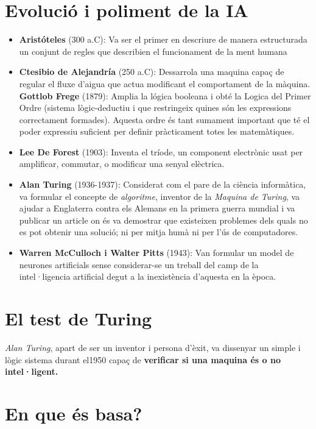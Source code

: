 \section{Evolució i poliment de la IA}
\begin{itemize}
\item  \textbf{Aristóteles} (300 a.C): Va ser el primer en descriure de manera estructurada un conjunt de regles que describien el funcionament de la ment humana
\item  \textbf{Ctesibio de Alejandría} (250 a.C): Dessarrola una maquina capaç de regular el fluxe d'aigua que actua modificant el comportament de la màquina.
\tiem \textbf{Gottlob Frege} (1879): Amplia la lógica booleana i obté la Logica del Primer Ordre (sistema lògic-deductiu i que restringeix quines són les expressions correctament formades). Aquesta ordre és tant sumament important que té el poder expressiu suficient per definir pràcticament totes les matemàtiques.
\item \textbf{Lee De Forest} (1903): Inventa el tríode, un component electrònic usat per amplificar, commutar, o modificar una senyal elèctrica.
\item \textbf{Alan Turing} (1936-1937): Considerat com el pare de la ciència informàtica, va formular el concepte de \emph{algoritme}, inventor de la \emph{Maquina de Turing}, va ajudar a Englaterra contra els Alemans en la primera guerra mundial i va publicar un article on és va demostrar que existeixen problemes dels quals no es pot obtenir una solució; ni per mitja humà ni per l'ús de computadores.
\item \textbf{Warren McCulloch i Walter Pitts} (1943): Van formular un model de neurones artificials sense considerar-se un treball del camp de la intel·ligencia artificial degut a la inexistència d'aquesta en la època.
\end{itemize}

\section{El test de Turing}

\emph{Alan Turing}, apart de ser un inventor i persona d'èxit, va dissenyar un simple i lògic sistema durant el1950 capaç de \textbf{verificar si una maquina és o no intel·ligent.}

\section{En que és basa?}

